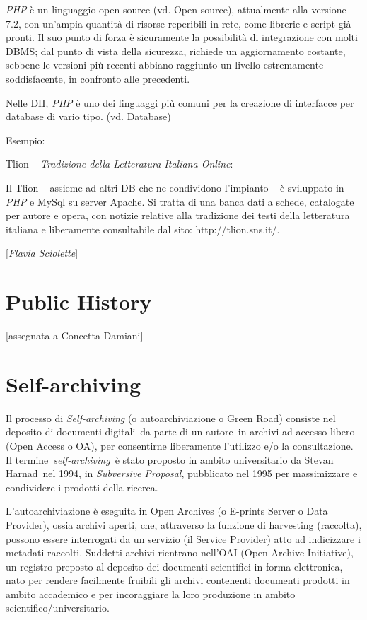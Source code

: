 {\emph{PHP} è un linguaggio open-source (vd. Open-source), attualmente
alla versione 7.2, con un'ampia quantità di risorse reperibili in rete,
come librerie e script già pronti. Il suo punto di forza è sicuramente
la possibilità di integrazione con molti DBMS; dal punto di vista della
sicurezza, richiede un aggiornamento costante, sebbene le versioni più
recenti abbiano raggiunto un livello estremamente soddisfacente, in
confronto alle precedenti.

Nelle DH, \emph{PHP} è uno dei linguaggi più comuni per la creazione di
interfacce per database di vario tipo. (vd. Database)

Esempio:

Tlion -- \emph{Tradizione della Letteratura Italiana Online}:

Il Tlion -- assieme ad altri DB che ne condividono l'impianto -- è
sviluppato in \emph{PHP} e MySql su server Apache. Si tratta di una
banca dati a schede, catalogate per autore e opera, con notizie relative
alla tradizione dei testi della letteratura italiana e liberamente
consultabile dal sito: http://tlion.sns.it/.

\hrulefill 
 
{[}\emph{Flavia Sciolette}{]}



\chapter{Public History}

{[}assegnata a Concetta Damiani{]}



\chapter{Self-archiving}

Il processo di \emph{Self-archiving} (o autoarchiviazione o Green Road)
consiste nel deposito di documenti digitali~da parte di un autore~in
archivi ad accesso libero (Open Access o OA), per consentirne
liberamente l'utilizzo e/o la consultazione. Il
termine~\emph{self-archiving}~è stato proposto in ambito universitario
da Stevan Harnad~nel 1994, in \emph{Subversive Proposal}, pubblicato nel
1995 per massimizzare e condividere i prodotti della ricerca.

L'autoarchiviazione è eseguita in Open Archives (o E-prints Server o
Data Provider), ossia archivi aperti, che, attraverso la funzione di
harvesting (raccolta), possono essere interrogati da un servizio (il
Service Provider) atto ad indicizzare i metadati raccolti. Suddetti
archivi rientrano nell'OAI (Open Archive Initiative), un registro
preposto al deposito dei documenti scientifici in forma elettronica,
nato per rendere facilmente fruibili gli archivi contenenti documenti
prodotti in ambito accademico e per incoraggiare la loro produzione in
ambito scientifico/universitario.

}
